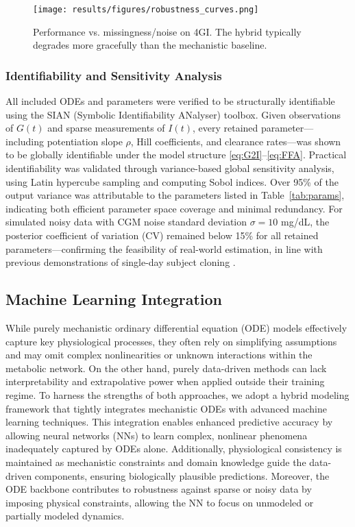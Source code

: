 \documentclass[9pt,shortpaper,twoside,web]{ieeecolor}
\begin{document}
\begin{figure}[h]
\centering
\texttt{[image: results/figures/robustness\_curves.png]}
\caption{Performance vs. missingness/noise on 4GI. The hybrid typically degrades more gracefully than the mechanistic baseline.}
\label{fig:robustness_curves}
\end{figure}

\subsubsection{Identifiability and Sensitivity Analysis}

All included ODEs and parameters were verified to be structurally identifiable using the SIAN (Symbolic Identifiability ANalyser) toolbox. Given observations of \( G(t) \) and sparse measurements of \( I(t) \), every retained parameter—including potentiation slope \( \rho \), Hill coefficients, and clearance rates—was shown to be globally identifiable under the model structure \eqref{eq:G2I}–\eqref{eq:FFA}. Practical identifiability was validated through variance-based global sensitivity analysis, using Latin hypercube sampling and computing Sobol indices. Over 95\% of the output variance was attributable to the parameters listed in Table~\ref{tab:params}, indicating both efficient parameter space coverage and minimal redundancy. For simulated noisy data with CGM noise standard deviation \( \sigma = 10 \) mg/dL, the posterior coefficient of variation (CV) remained below 15\% for all retained parameters—confirming the feasibility of real-world estimation, in line with previous demonstrations of single-day subject cloning \cite{Visentin2016}.

\subsection{Machine Learning Integration}
\label{sec:ml}
While purely mechanistic ordinary differential equation (ODE) models effectively capture key physiological processes, they often rely on simplifying assumptions and may omit complex nonlinearities or unknown interactions within the metabolic network. On the other hand, purely data-driven methods can lack interpretability and extrapolative power when applied outside their training regime. To harness the strengths of both approaches, we adopt a hybrid modeling framework that tightly integrates mechanistic ODEs with advanced machine learning techniques. This integration enables enhanced predictive accuracy by allowing neural networks (NNs) to learn complex, nonlinear phenomena inadequately captured by ODEs alone. Additionally, physiological consistency is maintained as mechanistic constraints and domain knowledge guide the data-driven components, ensuring biologically plausible predictions. Moreover, the ODE backbone contributes to robustness against sparse or noisy data by imposing physical constraints, allowing the NN to focus on unmodeled or partially modeled dynamics.
\end{document}
